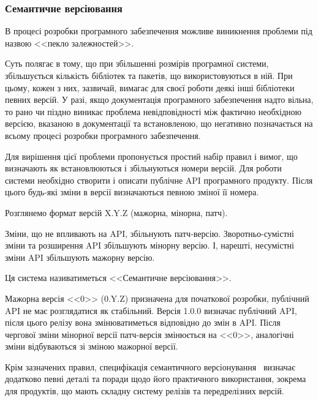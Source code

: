 \subsubsection{Семантичне версіювання}

В процесі розробки програмного забезпечення можливе виникнення проблеми під назвою <<пекло залежностей>>. 

Суть полягає в тому, що при збільшенні розмірів програмної системи, збільшується кількість бібліотек та пакетів, що використовуються в ній. При цьому, кожен з них, зазвичай, вимагає для своєї роботи деякі інші бібліотеки певних версій. У разі, якщо документація програмного забезпечення надто вільна, то рано чи піздно виникає проблема невідповідності між фактично необхідною версією, вказаною в документації та встановленою, що негативно позначається на всьому процесі розробки програмного забезпечення.

Для вирішення цієї проблеми пропонується простий набір правил і вимог, що визначають як встановлюються і збільнуються номери версій. Для роботи системи необхідно створити і описати публічне API програмного продукту. Після цього будь-які зміни в версії визначаються певною зміної її номера.

Розглянемо формат версій X.Y.Z (мажорна, мінорна, патч).

Зміни, що не впливають на API, збільнують патч-версію. Зворотньо-сумістні зміни та розширення API збільшують мінорну версію. І, нарешті, несумістні зміни API збільшують мажорну версію.

Ця система називатиметься <<Семантичне версіювання>>.

Мажорна версія <<0>> (0.Y.Z) призначена для початкової розробки, публічний API не має розглядатися як стабільний. Версія 1.0.0 визначає публічний API, після цього релізу вона змінюватиметься відповідно до змін в API. Після чергової зміни мінорної версії патч-версія змінюється на <<0>>, аналогічні зміни відбуваються зі зміною мажорної версії.

Крім зазначених правил, специфікація семантичного версіонування~\cite{semver} визначає додатково певні деталі та поради щодо його практичного використання, зокрема для продуктів, що мають складну систему релізів та передрелізних версій.
